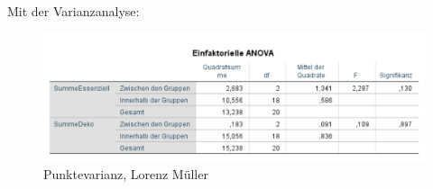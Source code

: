 Mit der Varianzanalyse: 

\begin{figure}[H]
\noindent\hspace{0.5mm}\includegraphics[width=15cm]{./Ressourcen/DekoEssGruppen.png}
\caption{Punktevarianz, Lorenz Müller}
\end{figure}

